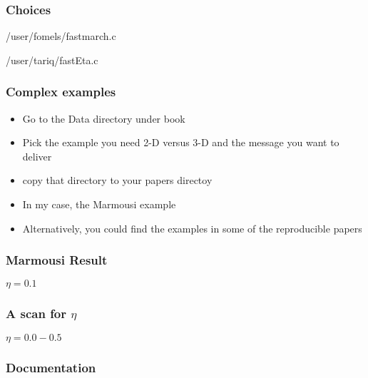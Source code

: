 \begin{frame} \frametitle{Choices}

\normalsize 

		{\RSFSRC/user/fomels/fastmarch.c}

		{\RSFSRC/user/tariq/fastEta.c}
		
\end{frame}
\cwpnote{}

\begin{frame} \frametitle{Complex examples}

\begin{itemize}
   \item Go to the Data directory under book
   \item Pick the example you need 2-D versus 3-D and the message you want to deliver
   \item copy that directory to your papers directoy
   \item In my case, the Marmousi example
   \item Alternatively, you could find the examples in some of the reproducible papers
\end{itemize}

\end{frame}
\cwpnote{}

\begin{frame} \frametitle{Marmousi Result}

\vspace{1in}
$\eta=0.1$
 \end{frame}
\cwpnote{}

\begin{frame} \frametitle{A scan for $\eta$}


$\eta=0.0-0.5$
 \end{frame}
\cwpnote{}



\begin{frame} \frametitle{Documentation}


\end{frame}
\cwpnote{}

